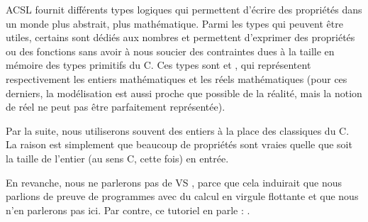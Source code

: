 ACSL fournit différents types logiques qui permettent d'écrire des
propriétés dans un monde plus abstrait, plus mathématique. Parmi les types qui
peuvent être utiles, certains sont dédiés aux nombres et permettent d'exprimer
des propriétés ou des fonctions sans avoir à nous soucier des contraintes dues
à la taille en mémoire des types primitifs du C. Ces types sont 
et , qui représentent respectivement les entiers mathématiques et
les réels mathématiques (pour ces derniers, la modélisation est aussi proche que
possible de la réalité, mais la notion de réel ne peut pas être parfaitement
représentée).



Par la suite, nous utiliserons souvent des entiers à la place des classiques
 du C. La raison est simplement que beaucoup de propriétés sont
vraies quelle que soit la taille de l'entier (au sens C, cette fois) en entrée.



En revanche, nous ne parlerons pas de  VS , parce que
cela induirait que nous parlions de preuve de programmes avec du calcul en virgule
flottante et que nous n'en parlerons pas ici. Par contre, ce tutoriel en parle :
.
